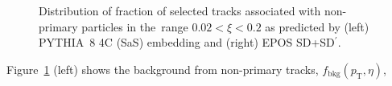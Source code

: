 \begin{figure}[b!]

	\caption{Distribution of fraction of selected tracks  associated with non-primary particles  in the~range $0.02<\xi<0.2$ as predicted by (left) PYTHIA~8 4C (SaS) embedding and (right) EPOS SD+SD$^\prime$.}
	\label{fig:bkg_fake_charged}
\end{figure}
Figure~\ref{fig:bkg_fake_charged} (left) shows the background from non-primary tracks, $f_{\textrm{bkg}}\left(p_{\textrm{T}},\eta\right)$, %
